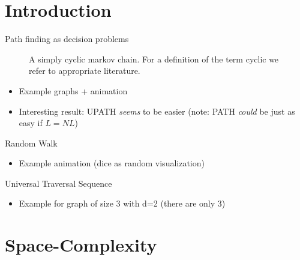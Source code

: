 \section{Introduction}\label{introduction}

\begin{frame}{Path finding as decision problems}

\begin{figure}
\caption{A simply cyclic markov chain. For a definition of the term cyclic we refer to appropriate literature.}
\label{cyclic-graph}
\end{figure}

\begin{itemize}
\item
  Example graphs + animation
\item
  Interesting result: UPATH \emph{seems} to be easier (note: PATH
  \emph{could} be just as easy if $L = NL$)
\end{itemize}

\end{frame}

\begin{frame}{Random Walk}

\begin{itemize}
\itemsep1pt\parskip0pt
\item
  Example animation (dice as random visualization)
\end{itemize}

\end{frame}

\begin{frame}{Universal Traversal Sequence}

\begin{itemize}
\itemsep1pt\parskip0pt
\item
  Example for graph of size 3 with d=2 (there are only 3)
\end{itemize}

\end{frame}

\section{Space-Complexity}\label{space-complexity}

